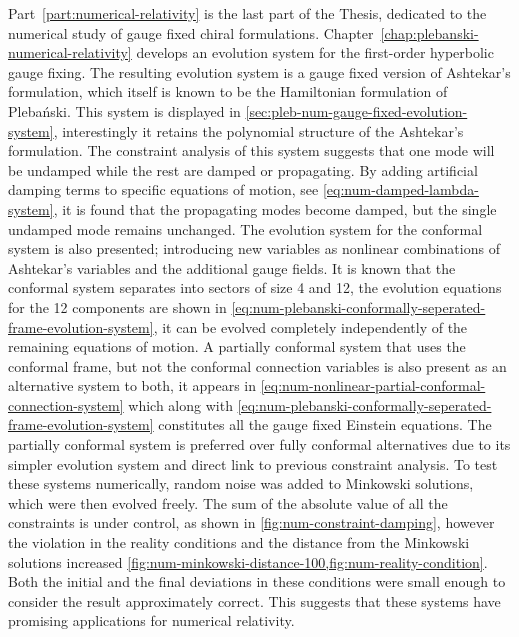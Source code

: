 \documentclass[10pt]{report}
\newcommand{\pleb}[0]{Pleba\'nski}
\theoremstyle{definition}
\begin{document}
	Part~\ref{part:numerical-relativity} is the last part of the Thesis, dedicated to the numerical study of gauge fixed chiral formulations. Chapter~\ref{chap:plebanski-numerical-relativity} develops an evolution system for the first-order hyperbolic gauge fixing. The resulting evolution system is a gauge fixed version of Ashtekar's formulation, which itself is known to be the Hamiltonian formulation of \pleb{}. This system is displayed in \cref{sec:pleb-num-gauge-fixed-evolution-system}, interestingly it retains the polynomial structure of the Ashtekar's formulation. The constraint analysis of this system suggests that one mode will be undamped while the rest are damped or propagating. By adding artificial damping terms to specific equations of motion, see \cref{eq:num-damped-lambda-system}, it is found that the propagating modes become damped, but the single undamped mode remains unchanged. The evolution system for the conformal system is also presented; introducing new variables as nonlinear combinations of Ashtekar's variables and the additional gauge fields. It is known that the conformal system separates into sectors of size 4 and 12, the evolution equations for the 12 components are shown in \cref{eq:num-plebanski-conformally-seperated-frame-evolution-system}, it can be evolved completely independently of the remaining equations of motion. A partially conformal system that uses the conformal frame, but not the conformal connection variables is also present as an alternative system to both, it appears in \cref{eq:num-nonlinear-partial-conformal-connection-system} which along with \cref{eq:num-plebanski-conformally-seperated-frame-evolution-system} constitutes all the gauge fixed Einstein equations. The partially conformal system is preferred over fully conformal alternatives due to its simpler evolution system and direct link to previous constraint analysis. To test these systems numerically, random noise was added to Minkowski solutions, which were then evolved freely. The sum of the absolute value of all the constraints is under control, as shown in \cref{fig:num-constraint-damping}, however the violation in the reality conditions and the distance from the Minkowski solutions increased \cref{fig:num-minkowski-distance-100,fig:num-reality-condition}. Both the initial and the final deviations in these conditions were small enough to consider the result approximately correct. This suggests that these systems have promising applications for numerical relativity. 
\end{document}
